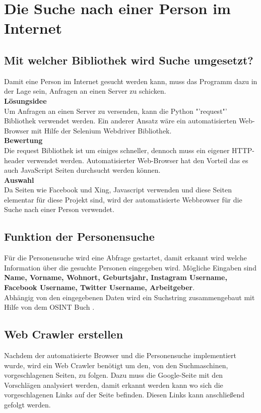 \section{Die Suche nach einer Person im Internet}
	\subsection{Mit welcher Bibliothek wird Suche umgesetzt?}
	Damit eine Person im Internet gesucht werden kann, muss das Programm dazu in der Lage sein, Anfragen an einen Server zu schicken. \\
	\textbf{Lösungsidee}\\
	Um Anfragen an einen Server zu versenden, kann die Python "'request"' Bibliothek verwendet werden. Ein anderer Ansatz wäre ein automatisierten Web-Browser mit Hilfe der Selenium Webdriver Bibliothek.\\
	\textbf{Bewertung}\\
	Die request Bibliothek ist um einiges schneller, dennoch muss ein eigener HTTP-header verwendet werden. Automatisierter Web-Browser hat den Vorteil das es auch JavaScript Seiten durchsucht werden können.\\
	\textbf{Auswahl}\\
	Da Seiten wie Facebook und Xing, Javascript verwenden und diese Seiten elementar für diese Projekt sind, wird der automatisierte Webbrowser für die Suche nach einer Person verwendet.
	\subsection{Funktion der Personensuche}
	Für die Personensuche wird eine Abfrage gestartet, damit erkannt wird welche Information über die gesuchte Personen eingegeben wird. Mögliche Eingaben sind \textbf{Name, Vorname, Wohnort, Geburtsjahr, Instagram Username, Facebook Username, Twitter Username, Arbeitgeber}.\\
	Abhängig von den eingegebenen Daten wird ein Suchstring zusammengebaut mit Hilfe von dem OSINT Buch \cite{Bazzell}. %
	\subsection{Web Crawler erstellen}
	Nachdem der automatisierte Browser und die Personensuche implementiert wurde, wird ein Web Crawler benötigt um den, von den Suchmaschinen, vorgeschlagenen Seiten, zu folgen. Dazu muss die Google-Seite mit den Vorschlägen analysiert werden, damit erkannt werden kann wo sich die vorgeschlagenen Links auf der Seite befinden. Diesen Links kann anschließend gefolgt werden.
	
